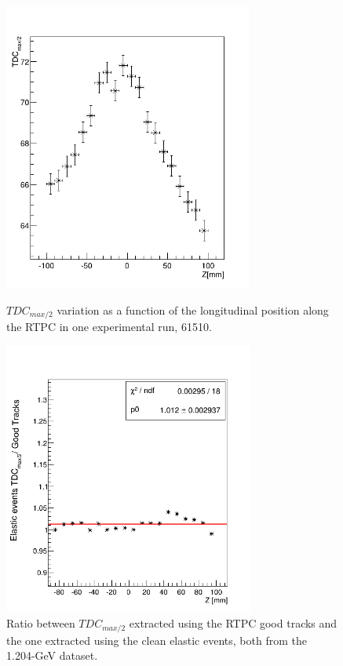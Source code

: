 \begin{figure}[tp]
\begin{minipage}[c]{.46\linewidth}
\hspace*{-0.3in}
\includegraphics[height=9.5cm]{fig_rtpc/RunNumber_61551_TDCmax_Zslice.png}
\caption{$TDC_{max/2}$ variation as a function of the longitudinal position along the RTPC in one experimental run, 61510.} 
\label{fig:RunNumber_61551_TDCmax_Zslice}
\end{minipage} \hfill
\begin{minipage}[c]{.46\linewidth}
\hspace*{-0.3in}
\includegraphics[height=9.0cm]{fig_rtpc/TDCmax_ratio_final.png}
\caption{Ratio between $TDC_{max/2}$ extracted using the RTPC good tracks and the one extracted using the clean elastic events, both from the 1.204-GeV dataset.}
\label{fig:TDCmax_ratio}
\end{minipage}
\end{figure}

